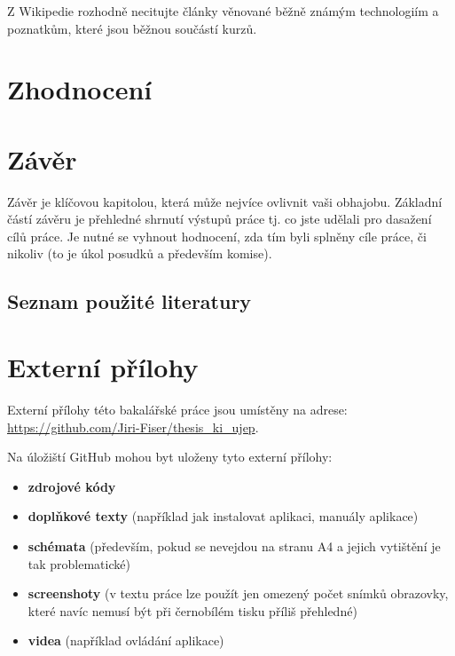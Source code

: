 \documentclass[male,czech,api_bc]{kitheses}
\begin{document}
Z Wikipedie rozhodně necitujte články věnované běžně známým technologiím a poznatkům, které jsou běžnou součástí kurzů. 

\chapter{Zhodnocení} 

\chapter{Závěr}

Závěr je klíčovou kapitolou, která může nejvíce ovlivnit vaši obhajobu. Základní částí závěru je přehledné shrnutí výstupů práce tj. co jste udělali pro dasažení cílů práce. Je nutné se vyhnout hodnocení, zda tím byli splněny cíle práce, či nikoliv (to je úkol posudků a především komise).

\sloppy
\section*{Seznam použité literatury}
\printbibliography
\printbibliography[title=Seznam použitých zdrojů]


\appendix

\chapter{Externí přílohy\label{sec:ep}}

Externí přílohy této bakalářské práce jsou umístěny na adrese:\\ \url{https://github.com/Jiri-Fiser/thesis_ki_ujep}.

Na úložiští GitHub mohou byt uloženy tyto externí přílohy:

\begin{itemize}
\item \textbf{zdrojové kódy}
\item \textbf{doplňkové texty} (například jak instalovat aplikaci, manuály aplikace)
\item \textbf{schémata} (především, pokud se nevejdou na stranu A4 a jejich vytištění je tak problematické)
\item \textbf{screenshoty} (v textu práce lze použít jen omezený počet snímků obrazovky, které navíc nemusí být při černobílém tisku příliš přehledné)
\item \textbf{videa} (například ovládání aplikace)
\end{itemize}
\end{document}
